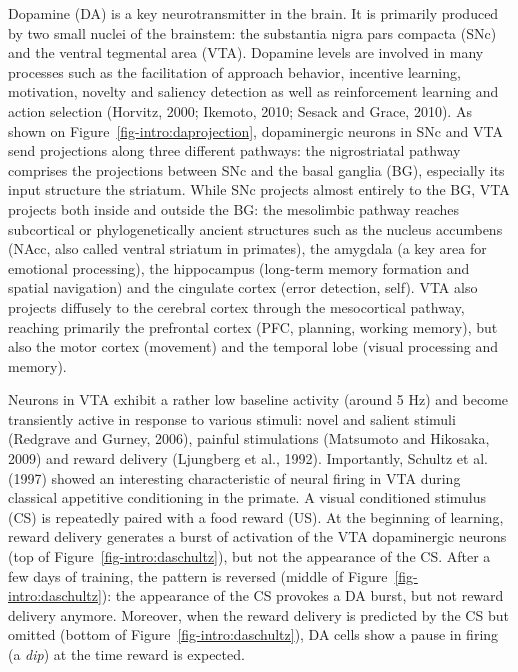 \documentclass[
  11pt,
  a4paper,
]{scrbook}
\begin{document}
Dopamine (DA) is a key neurotransmitter in the brain. It is primarily
produced by two small nuclei of the brainstem: the substantia nigra pars
compacta (SNc) and the ventral tegmental area (VTA). Dopamine levels are
involved in many processes such as the facilitation of approach
behavior, incentive learning, motivation, novelty and saliency detection
as well as reinforcement learning and action selection (Horvitz, 2000;
Ikemoto, 2010; Sesack and Grace, 2010). As shown on
Figure~\ref{fig-intro:daprojection}, dopaminergic neurons in SNc and VTA
send projections along three different pathways: the nigrostriatal
pathway comprises the projections between SNc and the basal ganglia
(BG), especially its input structure the striatum. While SNc projects
almost entirely to the BG, VTA projects both inside and outside the BG:
the mesolimbic pathway reaches subcortical or phylogenetically ancient
structures such as the nucleus accumbens (NAcc, also called ventral
striatum in primates), the amygdala (a key area for emotional
processing), the hippocampus (long-term memory formation and spatial
navigation) and the cingulate cortex (error detection, self). VTA also
projects diffusely to the cerebral cortex through the mesocortical
pathway, reaching primarily the prefrontal cortex (PFC, planning,
working memory), but also the motor cortex (movement) and the temporal
lobe (visual processing and memory).

Neurons in VTA exhibit a rather low baseline activity (around 5 Hz) and
become transiently active in response to various stimuli: novel and
salient stimuli (Redgrave and Gurney, 2006), painful stimulations
(Matsumoto and Hikosaka, 2009) and reward delivery (Ljungberg et al.,
1992). Importantly, Schultz et al. (1997) showed an interesting
characteristic of neural firing in VTA during classical appetitive
conditioning in the primate. A visual conditioned stimulus (CS) is
repeatedly paired with a food reward (US). At the beginning of learning,
reward delivery generates a burst of activation of the VTA dopaminergic
neurons (top of Figure~\ref{fig-intro:daschultz}), but not the
appearance of the CS. After a few days of training, the pattern is
reversed (middle of Figure~\ref{fig-intro:daschultz}): the appearance of
the CS provokes a DA burst, but not reward delivery anymore. Moreover,
when the reward delivery is predicted by the CS but omitted (bottom of
Figure~\ref{fig-intro:daschultz}), DA cells show a pause in firing (a
\emph{dip}) at the time reward is expected.
\end{document}

